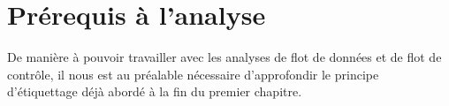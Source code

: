 \section{Prérequis à l'analyse}
De manière à pouvoir travailler avec les analyses de flot de données et de flot de contrôle, 
il nous est au préalable nécessaire d'approfondir le principe d'étiquettage déjà abordé à la fin du premier chapitre.



